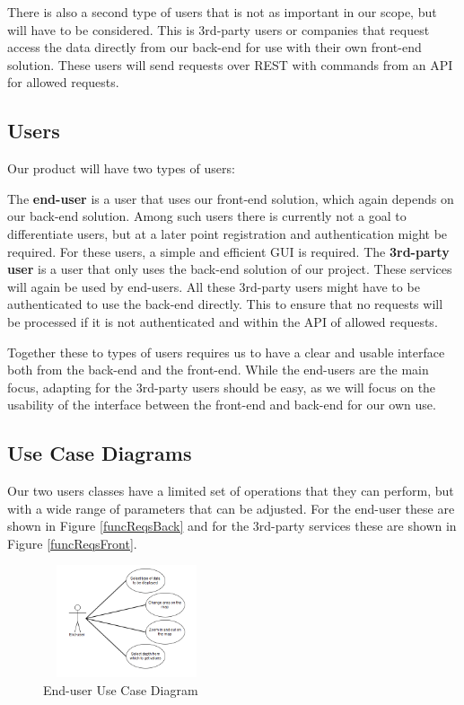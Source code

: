\documentclass[11pt,a4paper,titlepage,oneside]{report}
\begin{document}
  There is also a second type of users that is not as important in our scope, but will have to be considered. This is 3rd-party users or companies that request access the data directly from our \gls{back-end} for use with their own \gls{front-end} solution. These users will send requests over REST with commands from an \gls{API} for allowed requests.

  \subsection{Users}
  Our product will have two types of users:
  
  The \textbf{end-user} is a user that uses our \gls{front-end} solution, which again depends on our \gls{back-end} solution. Among such users there is currently not a goal to differentiate users, but at a later point registration and authentication might be required. For these users, a simple and efficient \gls{GUI} is required.  
  The \textbf{3rd-party user} is a user that only uses the \gls{back-end} solution of our project. These services will again be used by end-users. All these 3rd-party users might have to be authenticated to use the \gls{back-end} directly. This to ensure that no requests will be processed if it is not authenticated and within the \gls{API} of allowed requests.
  
  Together these to types of users requires us to have a clear and usable interface both from the \gls{back-end} and the \gls{front-end}. While the end-users are the main focus, adapting for the 3rd-party users should be easy, as we will focus on the usability of the interface between the \gls{front-end} and \gls{back-end} for our own use.

  \subsection{Use Case Diagrams}
  Our two users classes have a limited set of operations that they can perform, but with a wide range of parameters that can be adjusted. For the end-user these are shown in Figure \ref{funcReqsBack} and for the 3rd-party services these are shown in Figure \ref{funcReqsFront}.
  \begin{figure}[h]
	\begin{center}
	\includegraphics[height=125px,width=186px]{img/useCase_EndUser.png}
	\caption{End-user Use Case Diagram}
	\label{fig:endUserUseDiagram}
	\small
	\end{center}
  \end{figure}
\end{document}
